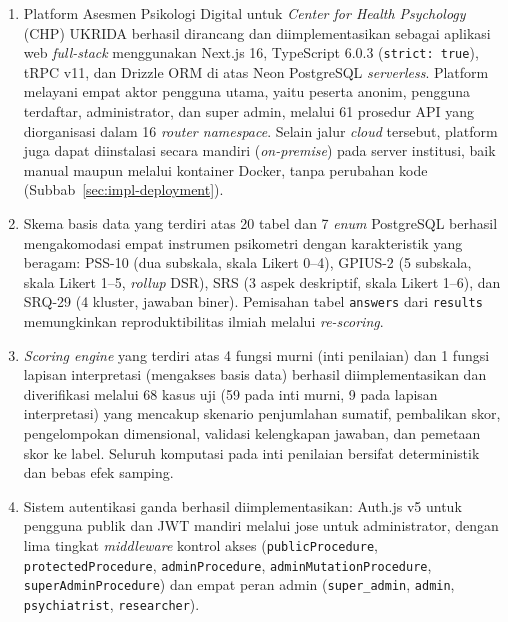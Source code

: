 \begin{enumerate}[leftmargin=2cm]
  \item Platform Asesmen Psikologi Digital untuk \textit{Center for Health Psychology} (CHP) UKRIDA berhasil dirancang dan diimplementasikan sebagai aplikasi web \textit{full-stack} menggunakan Next.js 16, TypeScript 6.0.3 (\texttt{strict: true}), tRPC v11, dan Drizzle ORM di atas Neon PostgreSQL \textit{serverless}. Platform melayani empat aktor pengguna utama, yaitu peserta anonim, pengguna terdaftar, administrator, dan super admin, melalui 61 prosedur API yang diorganisasi dalam 16 \textit{router namespace}. Selain jalur \textit{cloud} tersebut, platform juga dapat diinstalasi secara mandiri (\textit{on-premise}) pada server institusi, baik manual maupun melalui kontainer Docker, tanpa perubahan kode (Subbab~\ref{sec:impl-deployment}).

  \item Skema basis data yang terdiri atas 20 tabel dan 7 \textit{enum} PostgreSQL berhasil mengakomodasi empat instrumen psikometri dengan karakteristik yang beragam: PSS-10 (dua subskala, skala Likert 0--4), GPIUS-2 (5 subskala, skala Likert 1--5, \textit{rollup} DSR), SRS (3 aspek deskriptif, skala Likert 1--6), dan SRQ-29 (4 kluster, jawaban biner). Pemisahan tabel \texttt{answers} dari \texttt{results} memungkinkan reproduktibilitas ilmiah melalui \textit{re-scoring}.

  \item \textit{Scoring engine} yang terdiri atas 4 fungsi murni (inti penilaian) dan 1 fungsi lapisan interpretasi (mengakses basis data) berhasil diimplementasikan dan diverifikasi melalui 68 kasus uji (59 pada inti murni, 9 pada lapisan interpretasi) yang mencakup skenario penjumlahan sumatif, pembalikan skor, pengelompokan dimensional, validasi kelengkapan jawaban, dan pemetaan skor ke label. Seluruh komputasi pada inti penilaian bersifat deterministik dan bebas efek samping.

  \item Sistem autentikasi ganda berhasil diimplementasikan: Auth.js v5 untuk pengguna publik dan JWT mandiri melalui jose untuk administrator, dengan lima tingkat \textit{middleware} kontrol akses (\texttt{publicProcedure}, \texttt{protectedProcedure}, \texttt{adminProcedure}, \texttt{adminMutationProcedure}, \texttt{superAdminProcedure}) dan empat peran admin (\texttt{super\_admin}, \texttt{admin}, \texttt{psychiatrist}, \texttt{researcher}).


\end{enumerate}

